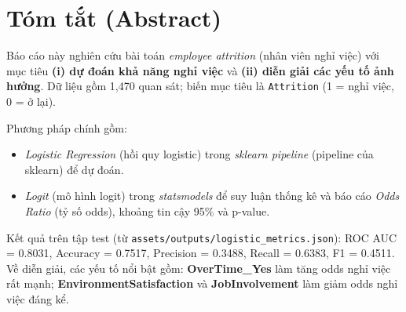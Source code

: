 \chapter*{Tóm tắt (Abstract)}

Báo cáo này nghiên cứu bài toán \textit{employee attrition} (nhân viên nghỉ việc) với mục tiêu \textbf{(i) dự đoán khả năng nghỉ việc} và \textbf{(ii) diễn giải các yếu tố ảnh hưởng}. 
Dữ liệu gồm 1{,}470 quan sát; biến mục tiêu là \texttt{Attrition} (1 = nghỉ việc, 0 = ở lại).

Phương pháp chính gồm:
\begin{itemize}
  \item \textit{Logistic Regression} (hồi quy logistic) trong \textit{sklearn pipeline} (pipeline của sklearn) để dự đoán.
  \item \textit{Logit} (mô hình logit) trong \textit{statsmodels} để suy luận thống kê và báo cáo \textit{Odds Ratio} (tỷ số odds), khoảng tin cậy 95\% và p-value.
\end{itemize}

Kết quả trên tập test (từ \texttt{assets/outputs/logistic\_metrics.json}): ROC AUC = 0.8031, Accuracy = 0.7517, Precision = 0.3488, Recall = 0.6383, F1 = 0.4511. 
Về diễn giải, các yếu tố nổi bật gồm: \textbf{OverTime\_Yes} làm tăng odds nghỉ việc rất mạnh; \textbf{EnvironmentSatisfaction} và \textbf{JobInvolvement} làm giảm odds nghỉ việc đáng kể.


